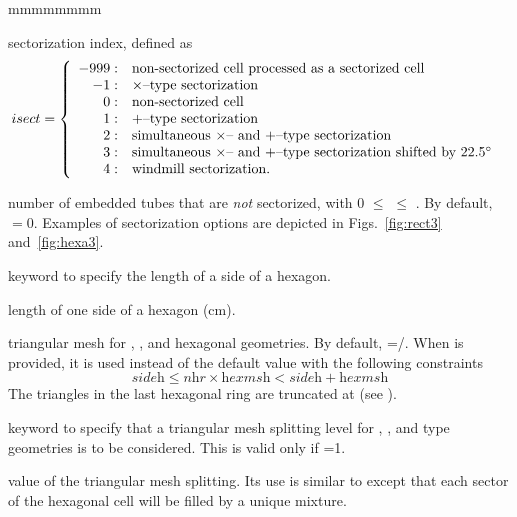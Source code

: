 \begin{ListeDeDescription}{mmmmmmmm}
\item[\dusa{isect}] sectorization index, defined as
\begin{displaymath}
\negthinspace\negthinspace\negthinspace isect = \left\{
\begin{array}{rl}
-999: & \textrm{non-sectorized cell processed as a sectorized cell} \\
-1: & \textrm{$\times$--type sectorization} \\
 0: & \textrm{non-sectorized cell} \\
 1: & \textrm{$+$--type sectorization} \\
 2: & \textrm{simultaneous $\times$-- and $+$--type sectorization} \\
 3: & \textrm{simultaneous $\times$-- and $+$--type sectorization shifted by 22.5$^\circ$} \\
 4: & \textrm{windmill sectorization.} 
\end{array} \right.
\end{displaymath}

\item[\dusa{jsect}] number of embedded tubes that are {\sl not} sectorized, with 0 $\le$  $\le$ . By default,  $=0$. Examples of sectorization options are depicted in Figs.~\ref{fig:rect3} and~\ref{fig:hexa3}.

\item[\moc{SIDE}] keyword to specify the length of a side of a hexagon.

\item[\dusa{sideh}] length of one side of a hexagon (cm).

\item[\dusa{hexmsh}] triangular mesh for , ,  and  hexagonal geometries. By default, =/. When  is provided, it is used instead of the default value with the following constraints 
$$
\textit{sideh} \le \textit{nhr}\times \textit{hexmsh}<\textit{sideh}+\textit{hexmsh}
$$
The triangles in the last hexagonal ring are truncated at  (see ).

\item[\moc{SPLITH}] keyword to specify that a triangular mesh splitting level for , ,  and type geometries is to be considered. This is valid only if =1. 

\item[\dusa{isplth}] value of the triangular mesh splitting. Its use is similar to  except that each sector of the hexagonal cell will be filled by a unique mixture.


\end{ListeDeDescription}
